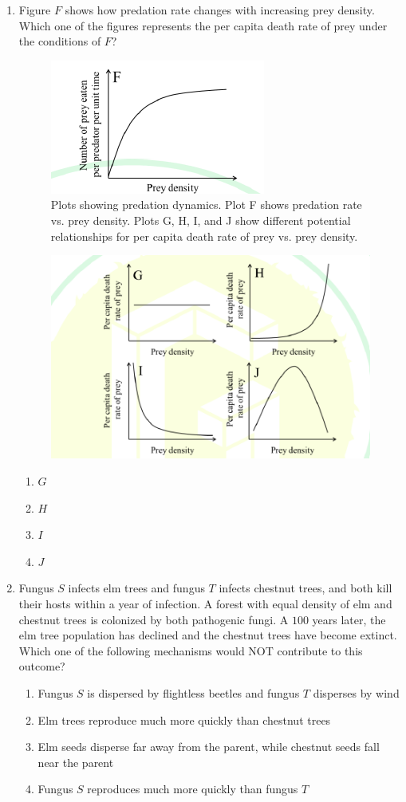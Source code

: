 \documentclass[journal]{IEEEtran}
\begin{document}
\begin{enumerate}
    
\item Figure $F$ shows how predation rate changes with increasing prey density.
Which one of the figures represents the per capita death rate of prey under the conditions of $F$?
\begin{figure}[!h]
        \centering
        \includegraphics[width=0.3\columnwidth]{figs/Q.41-a.png}
        \caption{Plots showing predation dynamics. Plot F shows predation rate vs. prey density. Plots G, H, I, and J show different potential relationships for per capita death rate of prey vs. prey density.}
        \label{fig:Q.41-a}
    \end{figure}
\begin{figure}[!h]
        \centering
        \includegraphics[width=0.3\columnwidth]{figs/Q.41-b.png}
        \caption{}
        \label{fig:Q.41-b}
    \end{figure}
    
    \begin{multicols}{4}
    \begin{enumerate}
        \item $G$
        \item $H$
        \item $I$
        \item $J$
    \end{enumerate}
    \end{multicols}
    
    \item Fungus $S$ infects elm trees and fungus $T$ infects chestnut trees, and both kill their hosts within a year 
of infection. A forest with equal density of elm and chestnut trees is colonized by both pathogenic fungi.
A $100$ years later, the elm tree population has declined and the chestnut trees have become extinct.
Which one of the following mechanisms would NOT contribute to this outcome?
\begin{enumerate}
        \item Fungus $S$ is dispersed by flightless beetles and fungus $T$ disperses by wind
        \item Elm trees reproduce much more quickly than chestnut trees
        \item Elm seeds disperse far away from the parent, while chestnut seeds fall near the parent
        \item Fungus $S$ reproduces much more quickly than fungus $T$
    \end{enumerate}
    

\end{enumerate}
\end{document}
